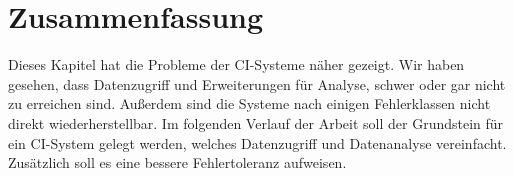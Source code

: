 \section{Zusammenfassung}

Dieses Kapitel hat die Probleme der CI-Systeme n\"aher gezeigt.
Wir haben gesehen, dass Datenzugriff und Erweiterungen f\"ur Analyse,
schwer oder gar nicht zu erreichen sind.
Außerdem sind die Systeme nach einigen Fehlerklassen nicht direkt wiederherstellbar.
Im folgenden Verlauf der Arbeit soll der Grundstein f\"ur ein CI-System gelegt werden,
welches Datenzugriff und Datenanalyse vereinfacht.
Zus\"atzlich soll es eine bessere Fehlertoleranz aufweisen.


